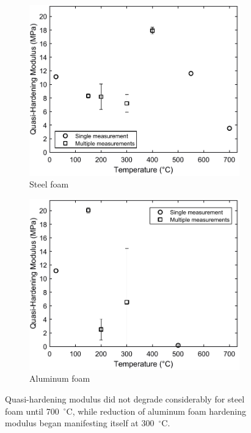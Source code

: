 \documentclass[review]{elsarticle}
\begin{document}
\begin{figure}
	\centering
	\begin{subfigure}{0.50\textwidth}
		\centering
		\includegraphics[width=0.90\linewidth]
		{Tex-Figures/Fig18a-quasi-Hardening-Fe.pdf}
		\caption{Steel foam}
		\label{fig:Quasi-hardening-modulus_Steel}
	\end{subfigure}%
	\begin{subfigure}{0.50\textwidth}
		\centering
		\includegraphics[width=0.90\linewidth]
		{Tex-Figures/Fig18b-quasi-Hardening-Al.pdf}
		\caption{Aluminum foam}
		\label{fig:Quasi-hardening-modulus_Al}
	\end{subfigure}
	\caption{ Quasi-hardening modulus did not degrade considerably for steel foam until 700~$^{\circ}\mathrm{C}$, while reduction of aluminum foam hardening modulus began manifesting itself at 300~$^{\circ}\mathrm{C}$.}
	\label{fig:Quasi-hardening-modulus}
\end{figure}
\end{document}
